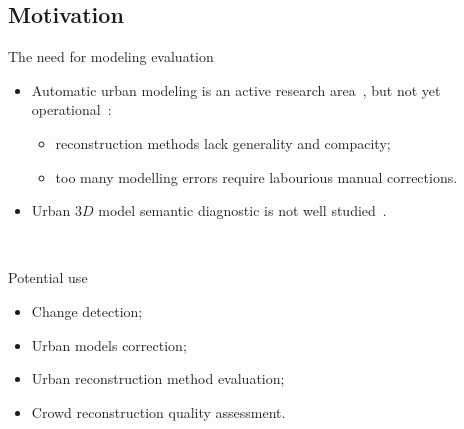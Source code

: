 \documentclass[export]{beamer}
\begin{document}
        \subsection{Motivation}
            \begin{frame}{The need for modeling evaluation}
                \begin{itemize}[label=$\blacktriangleright$, font=\color{IGNGreen}]
                    \item<1-> Automatic urban modeling is an active research area~\citep{Musialski2012}, but not \textcolor{IGNRed}{yet operational}~\citep{rottensteiner2014results}:
                    \begin{itemize}[label=--]
                        \item reconstruction methods lack generality and compacity;
                        \item too many modelling errors require labourious manual corrections.
                    \end{itemize}
                    \item<2-> Urban $3D$ model semantic diagnostic is not well studied~\citep{nguatem2017modeling}.
                \end{itemize}
                ~\\
            \end{frame}
            \begin{frame}{Potential use}
                \begin{itemize}[label=$\blacktriangleright$, font=\color{IGNGreen}, itemsep=2em]
                    \item<1-> Change detection;
                    \item<2-> Urban models correction;
                    \item<3-> Urban reconstruction method evaluation;
                    \item<4-> Crowd reconstruction quality assessment.
                \end{itemize}
            \end{frame}
\end{document}
